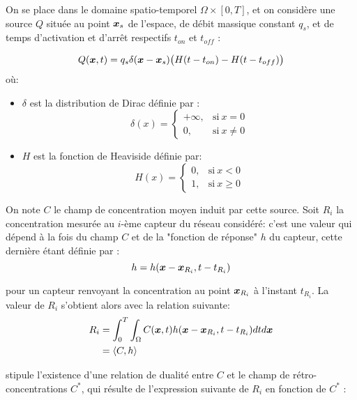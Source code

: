 {
	On se place dans le domaine spatio-temporel $\Omega \times [0,T]$, et on considère une source $Q$ située au point ${\bm{x}_s}$ de l'espace, de débit massique constant $q_s$, et de temps d'activation et d'arrêt respectifs $t_{on}$ et $t_{off}$ : 

		\begin{equation}
		Q({\bm{x}}, t) = q_s \delta({\bm{x}} - {\bm{x}_s})\big(H(t-t_{on}) - H(t-t_{off})\big)
	\end{equation}
	où:
	\begin{itemize}
		\item $\delta$ est la distribution de Dirac définie par : 
		\begin{equation}
		\delta(x) = 
		\begin{cases}
		+\infty, & \text{si} ~ x=0 \\
		0, & \text{si} ~ x\neq 0
		\end{cases}
		\end{equation}
		\item $H$ est la fonction de Heaviside définie par:
		\begin{equation}
		H(x) = 
		\begin{cases}
			0, & \text{si} ~ x<0 \\
			1, & \text{si} ~ x \geq 0
		\end{cases}
		\end{equation}

	\end{itemize}

On note $C$ le champ de concentration moyen induit par cette source. Soit $R_i$ la concentration mesurée au $i$-ème capteur du réseau considéré: c'est une valeur qui dépend à la fois du champ $C$ et de la "fonction de réponse" $h$ du capteur, cette dernière étant définie par : 
\begin{equation}
h = h({\bm{x}} - {\bm{x}}_{R_i}, t - t_{R_i})
\end{equation}

pour un capteur renvoyant la concentration au point ${\bm{x}}_{R_i}$ à l'instant $t_{R_i}$. La valeur de $R_i$ s'obtient alors avec la relation suivante:
\begin{equation}
\begin{split}
R_i &= \int_0^T \int_{\Omega} C({\bm{x}},t)h({\bm{x}} - {\bm{x}}_{R_i}, t - t_{R_i})dtd{\bm{x}} \\
&= \langle C, h \rangle
\end{split}
\end{equation}

\cite{Keats2007} stipule l'existence d'une relation de dualité entre $C$ et le champ de rétro-concentrations $C^*$, qui résulte de l'expression suivante de $R_i$ en fonction de $C^*$ : 

}

